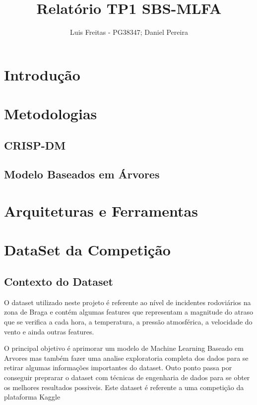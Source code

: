 \documentclass[a4paper,10pt]{article}
\title{Relatório TP1 SBS-MLFA}
\author{Luis Freitas - PG38347; Daniel Pereira}
\begin{document}
\maketitle

\begin{abstract}

\end{abstract}

\section{Introdução}
\newpage
\section{Metodologias}
\subsection{CRISP-DM}
\subsection{Modelo Baseados em Árvores}
\newpage



\section{Arquiteturas e Ferramentas}
\newpage

\section{DataSet da Competição}

\newpage


\subsection{Contexto do Dataset}
O dataset utilizado neste projeto é referente ao nível de incidentes rodoviários na zona de Braga e contém algumas features que representam a magnitude do atraso que se verifica a cada hora, a temperatura, a pressão atmosférica, a velocidade do vento e ainda outras features. 

O principal objetivo é aprimorar um modelo de Machine Learning Baseado em Arvores mas também fazer uma analise exploratoria completa dos dados para se retirar algumas informações importantes do dataset. Outo ponto passa por conseguir preprarar o dataset com técnicas de engenharia de dados para se obter os melhores resultados possiveis. Este dataset é referente a uma competição da plataforma Kaggle
\end{document}
